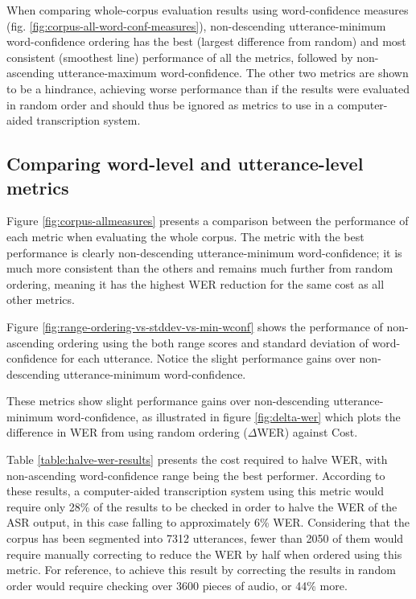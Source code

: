 When comparing whole-corpus evaluation results using word-confidence measures (fig. \ref{fig:corpus-all-word-conf-measures}), non-descending utterance-minimum word-confidence ordering has the best (largest difference from random) and most consistent (smoothest line) performance of all the metrics, followed by non-ascending utterance-maximum word-confidence.
The other two metrics are shown to be a hindrance, achieving worse performance than if the results were evaluated in random order and should thus be ignored as metrics to use in a computer-aided transcription system.

\subsection{Comparing word-level and utterance-level metrics}

Figure \ref{fig:corpus-allmeasures} presents a comparison between the performance of each metric when evaluating the whole corpus.
The metric with the best performance is clearly non-descending utterance-minimum word-confidence; it is much more consistent than the others and remains much further from random ordering, meaning it has the highest WER reduction for the same cost as all other metrics.



Figure \ref{fig:range-ordering-vs-stddev-vs-min-wconf} shows the performance of non-ascending ordering using the both range scores and standard deviation of word-confidence for each utterance. 
Notice the slight performance gains over non-descending utterance-minimum word-confidence.

These metrics show slight performance gains over non-descending utterance-minimum word-confidence, as illustrated in figure \ref{fig:delta-wer} which plots the difference in WER from using random ordering ($\Delta$WER) against Cost.

Table \ref{table:halve-wer-results} presents the cost required to halve WER, with non-ascending word-confidence range being the best performer.
According to these results, a computer-aided transcription system using this metric would require only 28\% of the results to be checked in order to halve the WER of the ASR output, in this case falling to approximately 6\% WER.
Considering that the corpus has been segmented into 7312 utterances, fewer than 2050 of them would require manually correcting to reduce the WER by half when ordered using this metric.
For reference, to achieve this result by correcting the results in random order would require checking over 3600 pieces of audio, or 44\% more.

